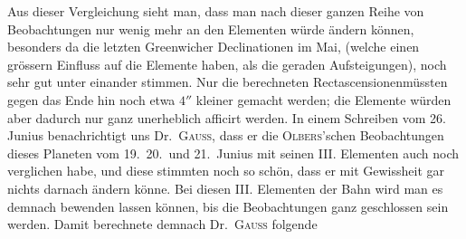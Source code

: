 \indent Aus dieser Vergleichung sieht man, dass man nach dieser ganzen Reihe von Beobachtungen nur wenig mehr an den Elementen würde ändern können, besonders da die letzten Greenwicher Declinationen im Mai, (welche einen grössern Einfluss auf die Elemente haben, als die geraden Aufsteigungen), noch sehr gut unter einander stimmen. Nur die berechneten Rectascensionen\footnotemark müssten gegen das Ende hin noch etwa $4''$ kleiner gemacht werden; die Elemente würden aber dadurch nur ganz unerheblich afficirt werden. In einem Schreiben vom 26. Junius benachrichtigt uns Dr.\ \textsc{Gauss}, dass er die \textsc{Olbers}'schen Beobachtungen dieses Planeten vom 19.\ 20.\ und 21.\ Junius mit seinen III. Elementen auch noch verglichen habe, und diese stimmten noch so schön, dass er mit Gewissheit gar nichts darnach ändern könne. Bei diesen III. Elementen der Bahn wird man es demnach bewenden lassen können, bis die Beobachtungen ganz geschlossen sein werden. Damit berechnete demnach Dr.\ \textsc{Gauss} folgende
